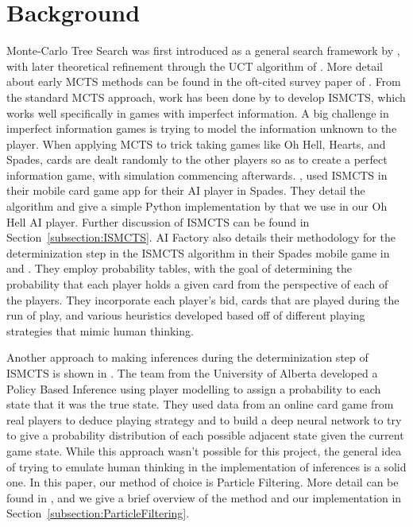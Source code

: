 \documentclass{article}
\begin{document}
\section{Background}
\label{section:Background}
Monte-Carlo Tree Search was first introduced as a general search framework by \citet{coulom2006mcts}, with later theoretical refinement through the UCT algorithm of \citet{kocsis2006uct}. More detail about early MCTS methods can be found in the oft-cited survey paper of \cite{browne2012survey}. 
From the standard MCTS approach, work has been done by \citet{cowling2012information} to develop ISMCTS, which works well specifically in games with imperfect information. A big challenge in imperfect information games is trying to model the information unknown to the player. 
When applying MCTS to trick taking games like Oh Hell, Hearts, and Spades, cards are dealt randomly to the other players so as to create a perfect information game, with simulation commencing afterwards. 
\citet{AIFactory2013}, \citep{winands2017magic} used ISMCTS in their mobile card game app for their AI player in Spades. They detail the algorithm and give a simple Python implementation by \citet{Cowling2013} that we use in our Oh Hell AI player. Further discussion of ISMCTS can be found in Section~\ref{subsection:ISMCTS}.
AI Factory also details their methodology for the determinization step in the ISMCTS algorithm in their Spades mobile game in \citep{rollason2018figuring} and \citep{rollason2019bidding_inferences}.
They employ probability tables, with the goal of determining the probability that each player holds a given card from the perspective of each of the players. They incorporate each player's bid, cards that are played during the run of play, and various heuristics developed based off of different playing strategies that mimic human thinking.

Another approach to making inferences during the determinization step of ISMCTS is shown in \citet{rebstock2019policy}. The team from the University of Alberta developed a Policy Based Inference using player modelling to assign a probability to each state that it was the true state. They used data from an online card game from real players to deduce playing strategy and to build a deep neural network to try to give a probability distribution of each possible adjacent state given the current game state.
While this approach wasn't possible for this project, the general idea of trying to emulate human thinking in the implementation of inferences is a solid one. In this paper, our method of choice is Particle Filtering. 
More detail can be found in \citep{cs188_particle_filtering}, and we give a brief overview of the method and our implementation in Section~\ref{subsection:ParticleFiltering}.
\end{document}
